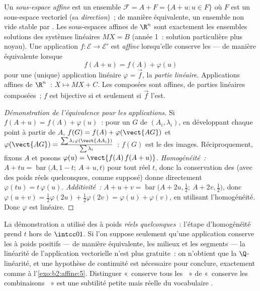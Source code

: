 \begin{definition}\label{def:b2:affine:subspace}
Un \emph{sous-espace affine} est un ensemble $\mathcal{F} = A + F = \{A + u :
u \in F\}$ où $F$ est un sous-espace vectoriel (sa \emph{direction})~;
de manière équivalente, un ensemble non vide stable par .
Les sous-espaces affines de $\R^n$ sont exactement les ensembles
solutions des systèmes linéaires
$MX = B$ (année 1~: solution particulière plus noyau). Une application $f \colon
\mathcal{E} \to \mathcal{E}'$ est \emph{affine}
lorsqu'elle conserve les  --- de manière équivalente lorsque
\[
f(A + u) = f(A) + \varphi(u)
\]
pour une (unique) application linéaire $\varphi = \vec f$, la
\emph{partie linéaire}. Applications affines de $\R^n$~: $X \mapsto MX + C$.
Les composées sont affines, de parties linéaires composées~; $f$ est
bijective si et seulement si $\vec f$ l'est.
\end{definition}

\begin{proof}[Démonstration de l'équivalence pour les applications]
Si $f(A + u) = f(A) + \varphi(u)$~: pour un  $G$ de $(A_i,
\lambda_i)$, en développant chaque point à partir de $A$, $f(G) = f(A) +
\varphi(\vect{AG})$ et $\varphi(\vect{AG}) =
\frac{\sum\lambda_i\varphi(\vect{AA_i})}{\sum\lambda_i}$~: $f(G)$ est
le  des images. Réciproquement, fixons $A$ et posons
$\varphi(u) = \vect{f(A)\,f(A + u)}$. \emph{Homogénéité~:} $A + tu =
\operatorname{bar}\bigl(A, 1-t;\ A + u, t\bigr)$ pour tout réel
$t$, donc la conservation des  (avec des poids réels
quelconques, comme supposé) donne directement $\varphi(tu) =
t\,\varphi(u)$. \emph{Additivité~:} $A + u + v = \operatorname{bar}\bigl(A + 2u,
\tfrac12;\ A + 2v, \tfrac12\bigr)$, donc $\varphi(u + v) =
\tfrac12\varphi(2u) + \tfrac12\varphi(2v) = \varphi(u) +
\varphi(v)$, en utilisant l'homogénéité. Donc $\varphi$ est linéaire.
\end{proof}

\begin{remark}
La démonstration a utilisé des  à poids \emph{réels
quelconques}~: l'étape d'homogénéité prend $t$ hors de $\intcc01$.
Si l'on suppose seulement qu'une application conserve les  à
poids positifs --- de manière équivalente, les milieux et les segments
--- la linéarité de l'application vectorielle n'est plus gratuite~:
on n'obtient que la $\Q$-linéarité, et une hypothèse de continuité est
nécessaire pour conclure, exactement comme à
l'\cref{exo:b2:affine:5}. Distinguer «~conserve tous les
~» de «~conserve les combinaisons ~» est une
subtilité petite mais réelle du vocabulaire .
\end{remark}

